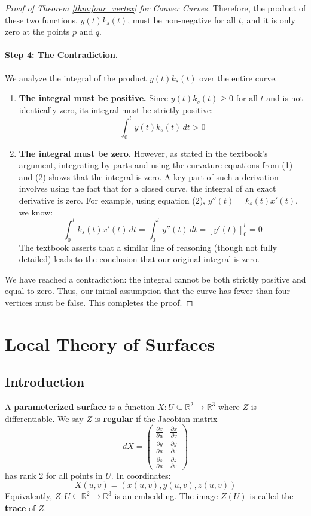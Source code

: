 \documentclass{article}
\begin{document}
\begin{proof}[Proof of Theorem \ref{thm:four_vertex} for Convex Curves]
Therefore, the product of these two functions, $y(t)k_s(t)$, must be non-negative for all $t$, and it is only zero at the points $p$ and $q$.

\paragraph{Step 4: The Contradiction.}
We analyze the integral of the product $y(t)k_s(t)$ over the entire curve.
\begin{enumerate}
    \item \textbf{The integral must be positive.} Since $y(t)k_s(t) \ge 0$ for all $t$ and is not identically zero, its integral must be strictly positive:
    $$ \int_0^l y(t)k_s(t) \, dt > 0 $$

    \item \textbf{The integral must be zero.} However, as stated in the textbook's argument, integrating by parts and using the curvature equations from (1) and (2) shows that the integral is zero. A key part of such a derivation involves using the fact that for a closed curve, the integral of an exact derivative is zero. For example, using equation (2), $y''(t) = k_s(t)x'(t)$, we know:
    $$ \int_0^l k_s(t)x'(t) \, dt = \int_0^l y''(t) \, dt = \left[ y'(t) \right]_0^l = 0 $$
    The textbook asserts that a similar line of reasoning (though not fully detailed) leads to the conclusion that our original integral is zero.
\end{enumerate}

We have reached a contradiction: the integral cannot be both strictly positive and equal to zero. Thus, our initial assumption that the curve has fewer than four vertices must be false. This completes the proof.
\end{proof}
\newpage
\section{Local Theory of Surfaces}
\subsection{Introduction}
\begin{definition}
A \textbf{parameterized surface} is a function $X: U \subseteq \mathbb{R}^2 \rightarrow \mathbb{R}^3$ where $Z$ is differentiable. We say $Z$ is \textbf{regular} if the Jacobian matrix
\[
dX= \begin{pmatrix}
\frac{\partial x}{\partial u} & \frac{\partial x}{\partial v} \\
\frac{\partial y}{\partial u} &\frac{\partial y}{\partial v} \\
\frac{\partial z}{\partial u} &\frac{\partial z}{\partial v}
\end{pmatrix}
\]
has rank 2 for all points in $U$. In coordinates:
\[
X(u,v) = (x(u,v), y(u,v), z(u,v))
\]
Equivalently, $Z: U \subseteq \mathbb{R}^2 \rightarrow \mathbb{R}^3$ is an embedding. The image $Z(U)$ is called the \textbf{trace} of $Z$.
\end{definition}
\end{document}
